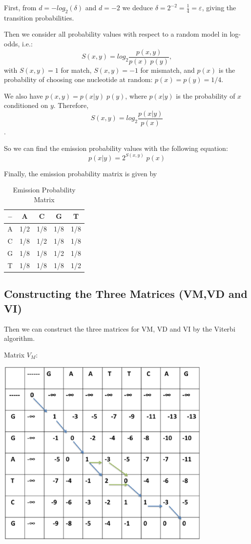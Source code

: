 \documentclass[english, a4paper,11pt]{article}
\begin{document}
First, from $d = -log_2(\delta)$ and $d = -2$ we deduce $\delta = 2^{-2} = \frac{1}{4} = \varepsilon$, 
giving the transition probabilities.

Then we consider all probability values with respect to a random model in log-odds, i.e.:
$$S(x,y)=log_2\frac{p(x,y)}{p(x)\; p(y)},$$
with $S(x,y)=1$ for match, $S(x,y)=-1$ for mismatch, 
and $p(x)$ is the probability of choosing one nucleotide at random: $p(x)=p(y)=1/4$.

We also have $p(x,y)=p(x|y)\;p(y)$, where $p(x|y)$ is the probability of $x$ conditioned on $y$. Therefore,
$$S(x,y)=log_2\frac{p(x|y)}{p(x)}$$.

So we can find the emission probability values with the following equation:
$$p(x|y)=2^{S(x,y)}\;p(x)$$

Finally, the emission probability matrix is given by

\begin{table}[ht]
\caption{Emission Probability Matrix}
\centering 
\begin{tabular}{c|c|c|c|c|}
-- & A  & C & G & T \\
\hline
A & 1/2 & 1/8 & 1/8 & 1/8 \\
\hline
C & 1/8  & 1/2 & 1/8 & 1/8 \\
\hline
G & 1/8 & 1/8 & 1/2 & 1/8 \\
\hline
T & 1/8 & 1/8 & 1/8 & 1/2 \\ \hline

\end{tabular}
\label{table:nonlin}
\end{table}


\subsection{Constructing the Three Matrices (VM,VD and VI)}

Then we can construct the three matrices for VM, VD and VI by the Viterbi algorithm.

Matrix $V_M$:
\begin{center}
\includegraphics[width=0.8\textwidth]{Slide1.eps}
\end{center}
\end{document}
